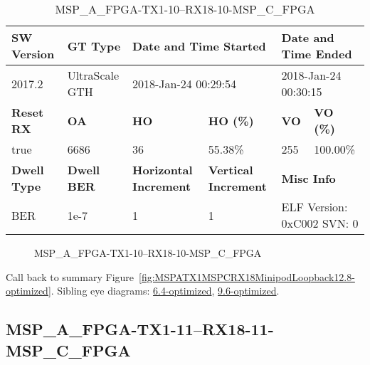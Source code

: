 \begin{table}[h]
\centering
\caption{MSP\_A\_FPGA-TX1-10--RX18-10-MSP\_C\_FPGA}
\label{tab:MSPAFPGATX110RX1810MSPCFPGA12.8-optimized}
\begin{tabular}{@{}|l|l|l|l|l|l|@{}}
\toprule
\textbf{SW Version}                & \textbf{GT Type}   & \multicolumn{2}{l|}{\textbf{Date and Time Started}}            & \multicolumn{2}{l|}{\textbf{Date and Time Ended}}        \\ \midrule
2017.2                       & UltraScale GTH          & \multicolumn{2}{l|}{2018-Jan-24 00:29:54}                   & \multicolumn{2}{l|}{2018-Jan-24 00:30:15}               \\ \midrule
\textbf{Reset RX}                  & \textbf{OA} & \textbf{HO}   & \textbf{HO (\%)} & \textbf{VO} & \textbf{VO (\%)} \\ \midrule
true & 6686        & 36          & 55.38\%        & 255        & 100.00\%       \\ \midrule
\textbf{Dwell Type}                & \textbf{Dwell BER} & \textbf{Horizontal Increment} & \textbf{Vertical Increment}    & \multicolumn{2}{l|}{\textbf{Misc Info}}                  \\ \midrule
BER                            & 1e-7        & 1        & 1           & \multicolumn{2}{l|}{ELF Version: 0xC002 SVN: 0}                         \\ \bottomrule
\end{tabular}
\end{table}

\begin{figure}[h]
\caption{MSP\_A\_FPGA-TX1-10--RX18-10-MSP\_C\_FPGA} \label{fig:MSPAFPGATX110RX1810MSPCFPGA12.8-optimized}
\end{figure}

Call back to summary Figure~\ref{fig:MSPATX1MSPCRX18MinipodLoopback12.8-optimized}.
Sibling eye diagrams: \hyperref[sec:MSPAFPGATX110RX1810MSPCFPGA6.4-optimized]{6.4-optimized}, \hyperref[sec:MSPAFPGATX110RX1810MSPCFPGA9.6-optimized]{9.6-optimized}.

\clearpage
\newpage


\subsection{MSP\_A\_FPGA-TX1-11--RX18-11-MSP\_C\_FPGA}\label{sec:MSPAFPGATX111RX1811MSPCFPGA12.8-optimized}

